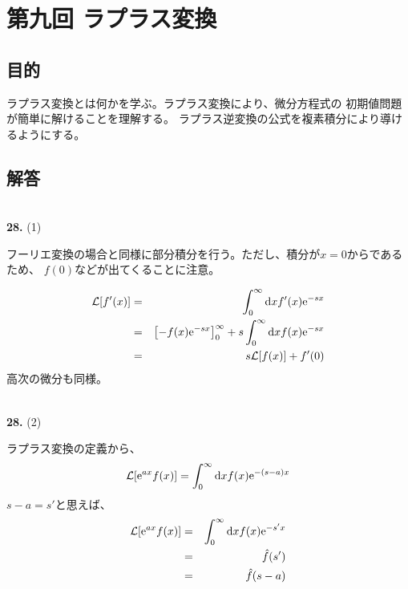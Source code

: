 \documentclass{jarticle}
\newcommand{\diff}{\mathrm d}
\newcommand{\ans}[2]{\noindent\\ {\bf \large #1.} (#2)}
\newcommand{\e}{\mathrm e}
\begin{document}
\newpage
\section{第九回 ラプラス変換}

\subsection{目的}

ラプラス変換とは何かを学ぶ。ラプラス変換により、微分方程式の
初期値問題が簡単に解けることを理解する。
ラプラス逆変換の公式を複素積分により導けるようにする。

\subsection{解答}

\ans{28}{1}

フーリエ変換の場合と同様に部分積分を行う。ただし、積分が$x=0$からであるため、
$f(0)$などが出てくることに注意。

\begin{eqnarray}
  {\cal L}[f'(x)] &=& \int_0^\infty \diff x f'(x)\e^{-sx} \\
  &=& \left[ -f(x)\e^{-sx} \right]_0^{\infty}  +  s \int_0^\infty \diff x f(x) \e^{-sx}\\
  &=& s {\cal L}[f(x)] + f'(0)
\end{eqnarray}
高次の微分も同様。

\ans{28}{2}

ラプラス変換の定義から、
\begin{equation}
  {\cal L}[\e^{ax }f(x)] = \int_0^\infty \diff x f(x)\e^{-(s-a)x}
\end{equation}
$s-a = s'$と思えば、
\begin{eqnarray}
  {\cal L}[\e^{ax }f(x)] &=& \int_0^\infty \diff x f(x)\e^{-s'x}\\
  &=& \hat{f}(s')\\
  &=& \hat{f}(s-a)
\end{eqnarray}
\end{document}
